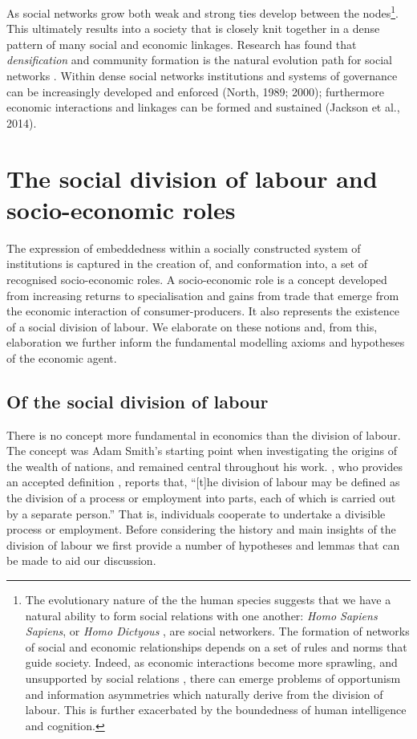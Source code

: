 As social networks grow both weak and strong ties develop between the nodes\footnote{The evolutionary nature of the the human species suggests that we have a natural ability to form social relations with one another: \emph{Homo Sapiens Sapiens}, or \emph{Homo Dictyous} \citep{ChristakisFowler2009}, are social networkers. The formation of networks of social and economic relationships depends on a set of rules and norms that guide society. Indeed, as economic interactions become more sprawling, and unsupported by social relations \citep{JacksonTan2012}, there can emerge problems of opportunism and information asymmetries which naturally derive from the division of labour. This is further exacerbated by the boundedness of human intelligence and cognition.}. This ultimately results into a society that is closely knit together in a dense pattern of many social and economic linkages. Research has found that \emph{densification} and community formation is the natural evolution path for social networks \citep{Leskovec2005a, Leskovec2007a, Leskovec2008}. Within dense social networks institutions and systems of governance can be increasingly developed and enforced (North, 1989; 2000); furthermore economic interactions and linkages can be formed and sustained (Jackson et al., 2014).

\section{The social division of labour and socio-economic roles}

The expression of embeddedness within a socially constructed system of institutions is captured in the creation of, and conformation into, a set of recognised socio-economic roles. A socio-economic role is a concept developed from increasing returns to specialisation and gains from trade that emerge from the economic interaction of consumer-producers. It also represents the existence of a social division of labour. We elaborate on these notions and, from this, elaboration we further inform the fundamental modelling axioms and hypotheses of the economic agent.

\subsection{Of the social division of labour}

There is no concept more fundamental in economics than the division of labour. The concept was Adam Smith's starting point when investigating the origins of the wealth of nations, and remained central throughout his work. \citet[p.~901]{Groenewegen1987}, who provides an accepted definition \citet[p.~4]{Sun2005}, reports that, ``[t]he division of labour may be defined as the division of a process or employment into parts, each of which is carried out by a separate person.'' That is, individuals cooperate to undertake a divisible process or employment. Before considering the history and main insights of the division of labour we first provide a number of hypotheses and lemmas that can be made to aid our discussion.

